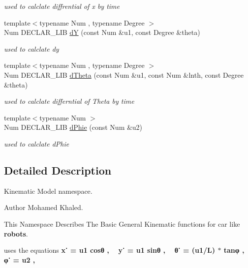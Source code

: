 \begin{DoxyCompactItemize}
\begin{DoxyCompactList}\small\item\em used to calclate diffrential of x by time \end{DoxyCompactList}\item 
{\footnotesize template$<$typename Num , typename Degree $>$ }\\Num D\+E\+C\+L\+A\+R\+\_\+\+L\+IB \hyperlink{namespace_path_1_1_kinematic_model_ace9021a98d588b74e2f4ea47f2025828}{dY} (const Num \&u1, const Degree \&theta)
\begin{DoxyCompactList}\small\item\em used to calclate dy \end{DoxyCompactList}\item 
{\footnotesize template$<$typename Num , typename Degree $>$ }\\Num D\+E\+C\+L\+A\+R\+\_\+\+L\+IB \hyperlink{namespace_path_1_1_kinematic_model_ad62a4223a54672b882f0a83f245eac5a}{d\+Theta} (const Num \&u1, const Num \&lnth, const Degree \&theta)
\begin{DoxyCompactList}\small\item\em used to calclate differntial of Theta by time \end{DoxyCompactList}\item 
{\footnotesize template$<$typename Num $>$ }\\Num D\+E\+C\+L\+A\+R\+\_\+\+L\+IB \hyperlink{namespace_path_1_1_kinematic_model_a99891b8ca08d1a54b9dbb88e6f2c5ea8}{d\+Phie} (const Num \&u2)
\begin{DoxyCompactList}\small\item\em used to calclate d\+Phie \end{DoxyCompactList}\end{DoxyCompactItemize}


\subsection{Detailed Description}
Kinematic Model namespace. 

\begin{DoxyAuthor}{Author}
Mohamed Khaled.
\end{DoxyAuthor}
This Namespace Describes The Basic General Kinematic functions for car like {\bfseries robots}.  \begin{DoxyParagraph}{uses the equations}
{\bfseries  x˙ = u1 cosθ , ~\newline
 y˙ = u1 sinθ , ~\newline
 θ˙ = (u1/L) $\ast$ tanφ , ~\newline
 φ˙ = u2 , ~\newline
 } 
\end{DoxyParagraph}


